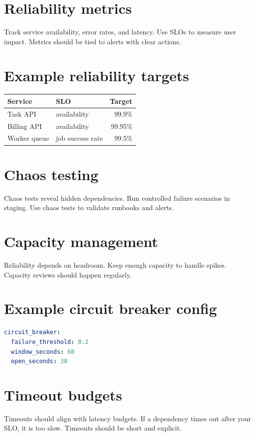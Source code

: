 \section{Reliability metrics}
Track service availability, error rates, and latency.
Use SLOs to measure user impact.
Metrics should be tied to alerts with clear actions.

\section{Example reliability targets}
\begin{tabularx}{\textwidth}{@{}lXr@{}}
\toprule
Service & SLO & Target \\
\midrule
Task API & availability & 99.9\% \\
Billing API & availability & 99.95\% \\
Worker queue & job success rate & 99.5\% \\
\bottomrule
\end{tabularx}

\section{Chaos testing}
Chaos tests reveal hidden dependencies.
Run controlled failure scenarios in staging.
Use chaos tests to validate runbooks and alerts.

\section{Capacity management}
Reliability depends on headroom.
Keep enough capacity to handle spikes.
Capacity reviews should happen regularly.

\section{Example circuit breaker config}
\begin{lstlisting}[language=YAML]
circuit_breaker:
  failure_threshold: 0.2
  window_seconds: 60
  open_seconds: 30
\end{lstlisting}

\section{Timeout budgets}
Timeouts should align with latency budgets.
If a dependency times out after your SLO, it is too slow.
Timeouts should be short and explicit.

